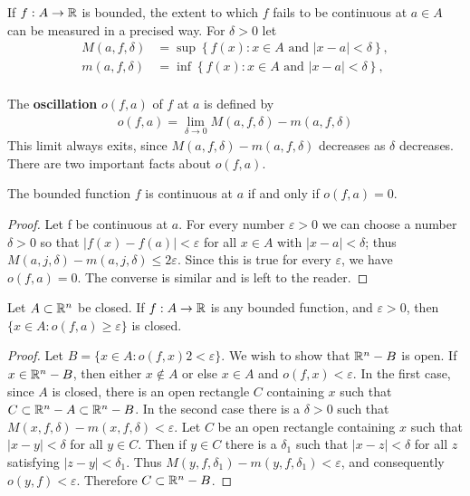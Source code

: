 If $f:A\to \mathbb{R}$ is bounded, the extent to which $f$ fails to be continuous at $a\in A$ can be measured in a precised 
way. For $\delta >0$ let 
\begin{align*}
    M(a, f, \delta) & = \sup\left\{f(x):x\in A\text{ and } |x-a|< \delta\right\}, \\
    m(a, f, \delta) & = \inf\left\{f(x):x\in A\text{ and } |x-a|< \delta\right\}, \\
\end{align*}

The \textbf{oscillation} $o(f, a)$ of $f$ at $a$ is defined by 
\begin{align*}
    o(f, a) = \lim_{\delta \to 0 }{M(a, f, \delta) - m(a, f, \delta)}
\end{align*}
This limit always exits, since $M(a, f, \delta) - m(a, f, \delta)$ decreases as $\delta$ decreases. There are two 
important facts about $o(f, a)$.

\begin{theorem}
    The bounded function $f$ is continuous at $a$ if and only if $o(f, a)= 0$.
\end{theorem}

\begin{proof}
    Let f be continuous at $a$. For every number $\varepsilon > 0$  
    we can choose a number $\delta > 0$ so that $|f(x) - f(a)|< \varepsilon$ for
    all $x \in A$ with $|x - a| < \delta$; thus $M(a,j,\delta)-m(a,j,\delta) \le 2\varepsilon$.
    Since this is true for every $\varepsilon$, we have $o(f,a) = 0$.
    The converse is similar and is left to the reader. 
\end{proof}



\begin{theorem}
    Let $A\subset \mathbb{R}^n$ be closed. If $f:A\to \mathbb{R}$ is any bounded function, and $\varepsilon>0$, then 
    $\{x\in A: o(f, a)\ge \varepsilon\}$ is closed.
\end{theorem}

\begin{proof}
    Let $B = \{x \in A: o(f,x) 2<\varepsilon\}$. We wish to show that $\mathbb{R}^n-B$ is open. 
    If $x \in \mathbb{R}^n -B$, then either $x \notin A$ or else $x \in A$ and $o(f,x) < \varepsilon$.
    In the first case, since $A$ is closed, there is an open rectangle $C$ containing $x$ such that
    $C \subset \mathbb{R}^n - A\subset \mathbb{R}^n-B$. In the second case there is a $\delta > 0$ 
    such that $M(x,f,\delta) - m(x,f,\delta) < \varepsilon$. Let $C$ be an open
    rectangle containing $x$ such that $|x - y|<\delta$ for all $y\in C$.
    Then if $y \in C$ there is a $\delta_1$ such that $|x - z| < \delta$ for all $z$
    satisfying $|z - y| < \delta_1$. Thus $M(y,f,\delta_1) - m(y,f,\delta_1) < \varepsilon$, and
    consequently $o(y,f) < \varepsilon$. Therefore $C \subset \mathbb{R}^n-B$.
\end{proof}

